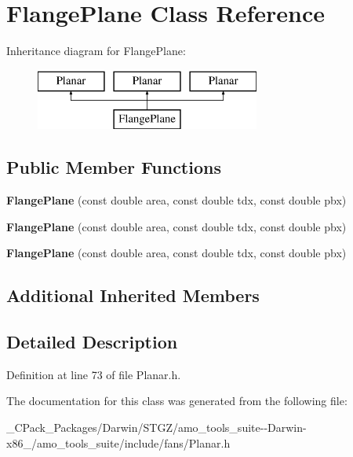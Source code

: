 \hypertarget{class_flange_plane}{}\section{Flange\+Plane Class Reference}
\label{class_flange_plane}
Inheritance diagram for Flange\+Plane\+:\begin{figure}[H]
\begin{center}
\leavevmode
\includegraphics[height=2.000000cm]{d0/de9/class_flange_plane}
\end{center}
\end{figure}
\subsection*{Public Member Functions}
\begin{DoxyCompactItemize}
\item 
\mbox{\label{class_flange_plane_a124814f4e579d4e0b415190e144147e6}} 
{\bfseries Flange\+Plane} (const double area, const double tdx, const double pbx)
\item 
\mbox{\label{class_flange_plane_a124814f4e579d4e0b415190e144147e6}} 
{\bfseries Flange\+Plane} (const double area, const double tdx, const double pbx)
\item 
\mbox{\label{class_flange_plane_a124814f4e579d4e0b415190e144147e6}} 
{\bfseries Flange\+Plane} (const double area, const double tdx, const double pbx)
\end{DoxyCompactItemize}
\subsection*{Additional Inherited Members}


\subsection{Detailed Description}


Definition at line 73 of file Planar.\+h.



The documentation for this class was generated from the following file\+:\begin{DoxyCompactItemize}
\item 
\+\_\+\+C\+Pack\+\_\+\+Packages/\+Darwin/\+S\+T\+G\+Z/amo\+\_\+tools\+\_\+suite-\/-\/\+Darwin-\/x86\+\_/amo\+\_\+tools\+\_\+suite/include/fans/Planar.\+h\end{DoxyCompactItemize}
